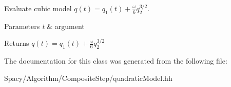 Evaluate cubic model $ q(t) = q_1(t) + \frac{\omega}{6}q_2^{3/2} $. 


\begin{DoxyParams}{Parameters}
{\em t} & argument \\
\hline
\end{DoxyParams}
\begin{DoxyReturn}{Returns}
$ q(t) = q_1(t) + \frac{\omega}{6}q_2^{3/2} $ 
\end{DoxyReturn}


The documentation for this class was generated from the following file\+:\begin{DoxyCompactItemize}
\item 
Spacy/\+Algorithm/\+Composite\+Step/quadratic\+Model.\+hh\end{DoxyCompactItemize}

